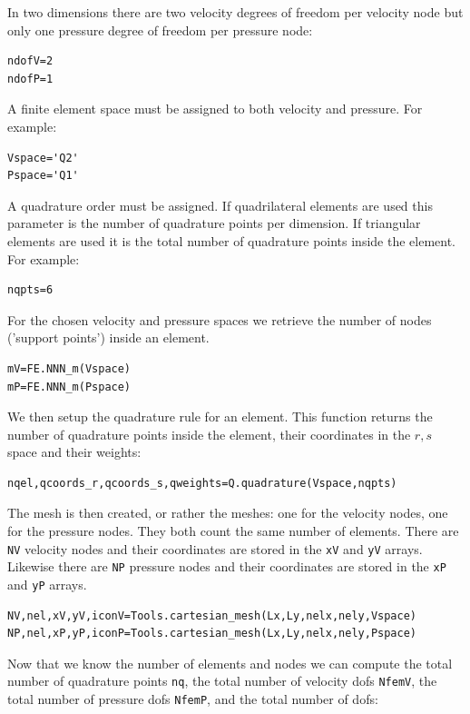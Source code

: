 In two dimensions there are two velocity degrees of freedom per 
velocity node but only one pressure degree of freedom per pressure node:
\begin{lstlisting}
ndofV=2
ndofP=1
\end{lstlisting}

A finite element space must be assigned to both velocity and pressure. For example: 
\begin{lstlisting}
Vspace='Q2'
Pspace='Q1'
\end{lstlisting}

A quadrature order must be assigned. If quadrilateral elements are used
this parameter is the number of quadrature points per dimension. 
If triangular elements are used it is the total number of quadrature points 
inside the element. For example: 
\begin{lstlisting}
nqpts=6
\end{lstlisting}

For the chosen velocity and pressure spaces we retrieve the number of nodes 
('support points') inside an element.
\begin{lstlisting}
mV=FE.NNN_m(Vspace)
mP=FE.NNN_m(Pspace)
\end{lstlisting}

We then setup the quadrature rule for an element. This function 
returns the number of quadrature points inside the element, 
their coordinates in the $r,s$ space and their weights: 
\begin{lstlisting}
nqel,qcoords_r,qcoords_s,qweights=Q.quadrature(Vspace,nqpts)
\end{lstlisting}

The mesh is then created, or rather the meshes: one for the 
velocity nodes, one for the pressure nodes. They both count the 
same number of elements. There are \lstinline{NV} velocity nodes and their
coordinates are stored in the \lstinline{xV} and \lstinline{yV} arrays.
Likewise there are \lstinline{NP} pressure nodes and their
coordinates are stored in the \lstinline{xP} and \lstinline{yP} arrays. 

\begin{lstlisting}
NV,nel,xV,yV,iconV=Tools.cartesian_mesh(Lx,Ly,nelx,nely,Vspace)
NP,nel,xP,yP,iconP=Tools.cartesian_mesh(Lx,Ly,nelx,nely,Pspace)
\end{lstlisting}

Now that we know the number of elements and nodes we can compute the 
total number of quadrature points \lstinline{nq}, 
the total number of velocity dofs \lstinline{NfemV}, 
the total number of pressure dofs \lstinline{NfemP}, 
and the total number of dofs:


